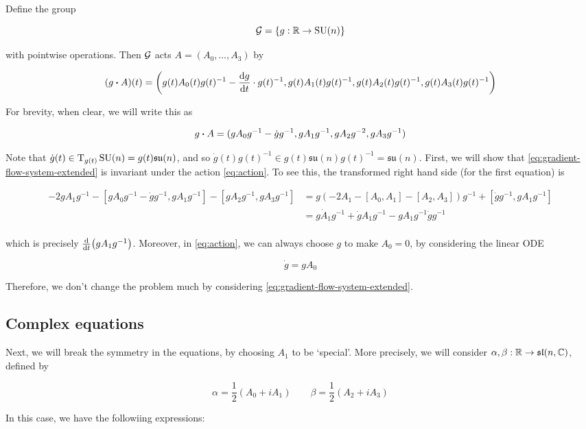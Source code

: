\documentclass{report}
\DeclareMathOperator{\SU}{SU}
\newcommand{\su}{\mathfrak{su}}
\renewcommand{\sl}{\mathfrak{sl}}
\begin{document}
Define the group

\[\mcG = \left\{g : \R \to \SU(n)\right\}\]

with pointwise operations. Then \(\mathcal{G}\) acts \(A = (A_0, \dots, A_3)\) by

\begin{equation}
    \label{eq:action}
    (g \vdot A)(t) = \left(g(t)A_0(t)g(t)^{-1} - \dv{g}{t}(t) \cdot g(t)^{-1}, g(t)A_1(t)g(t)^{-1}, g(t)A_2(t)g(t)^{-1}, g(t)A_3(t)g(t)^{-1}\right)
\end{equation}

For brevity, when clear, we will write this as

\[g \vdot A = (gA_0g^{-1} - \dot g g^{-1}, gA_1g^{-1}, gA_2g^{-2}, gA_3g^{-1})\]

Note that \(\dot g(t) \in \TT_{g(t)}\SU(n) = g(t)\su(n)\), and so \(\dot g(t)g(t)^{-1} \in g(t)\su(n)g(t)^{-1} = \su(n)\). First, we will show that \cref{eq:gradient-flow-system-extended} is invariant under the action \cref{eq:action}. To see this, the transformed right hand side (for the first equation) is

\begin{align*}
    -2gA_1g^{-1} - [gA_0g^{-1} - \dot g g^{-1}, gA_1g^{-1}] - [gA_2g^{-1}, gA_3g^{-1}] &= g(-2A_1 - [A_0, A_1] - [A_2, A_3])g^{-1} + [\dot g g^{-1}, gA_1g^{-1}] \\
    &= g\dot A_1g^{-1} + \dot g A_1 g^{-1} - gA_1g^{-1}\dot g g^{-1} \\
\end{align*}

which is precisely \(\dv{t}(gA_1g^{-1})\). Moreover, in \cref{eq:action}, we can always choose \(g\) to make \(A_0 = 0\), by considering the linear ODE

\[\dot g = gA_0\]

Therefore, we don't change the problem much by considering \cref{eq:gradient-flow-system-extended}. 

\subsection{Complex equations}

Next, we will break the symmetry in the equations, by choosing \(A_1\) to be `special'. More precisely, we will consider \(\alpha, \beta : \R \to \sl(n, \C)\), defined by

\[\alpha = \frac{1}{2}(A_0 + iA_1) \qquad \beta = \frac{1}{2}(A_2 + iA_3)\]

In this case, we have the followiing expressions:
\end{document}
